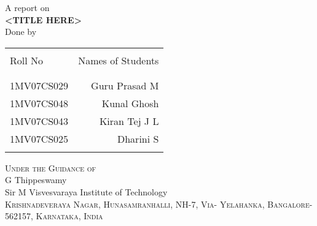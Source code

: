 \begin{titlepage}

\begin{center}

\textup{\large A report on}\\[1.0cm]

\uppercase{\Large \textbf {<title here>}}\\[3.0cm]

\normalsize Done by \\
\begin{table}[h]
\centering
\begin{tabular}{lr}\hline \\
Roll No & Names of Students \\ \\ \hline
\\
1MV07CS029 & Guru Prasad M \\
1MV07CS048 & Kunal Ghosh \\
1MV07CS043 & Kiran Tej J L \\
1MV07CS025 & Dharini S \\ \\ \hline 
\end{tabular}
\end{table}

\vfill

\normalsize
\textsc{Under the Guidance of }\\
G Thippeswamy\\
\LARGE{Sir M Visvesvaraya Institute of Technology }\\
\normalsize
\textsc{Krishnadeveraya Nagar, Hunasamranhalli, NH-7, Via- Yelahanka, Bangalore-562157, Karnataka, India}\\

\vspace{0.5cm}


\end{center}

\end{titlepage}
